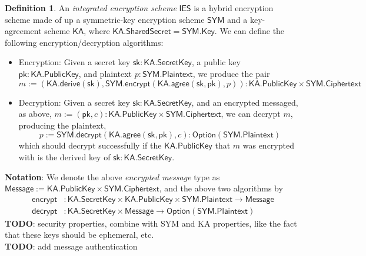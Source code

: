 \documentclass[a4paper]{article}
\newcommand{\TODO}[1]{{\color{red}\textbf{TODO}}: #1}
\theoremstyle{definition}
\newtheorem{definition}{Definition}[subsection]
\newcommand{\Ciphertext}{{\textsf{Ciphertext}}}
\newcommand{\IES}{{\textsf{IES}}}
\newcommand{\KA}{{\textsf{KA}}}
\newcommand{\Key}{{\textsf{Key}}}
\newcommand{\Message}{{\textsf{Message}}}
\newcommand{\Option}{{\textsf{Option}}}
\newcommand{\Plaintext}{{\textsf{Plaintext}}}
\newcommand{\PublicKey}{{\textsf{PublicKey}}}
\newcommand{\SYM}{{\textsf{SYM}}}
\newcommand{\SecretKey}{{\textsf{SecretKey}}}
\newcommand{\SharedSecret}{{\textsf{SharedSecret}}}
\newcommand{\agree}{{\textsf{agree}}}
\newcommand{\decrypt}{{\textsf{decrypt}}}
\newcommand{\derive}{{\textsf{derive}}}
\newcommand{\encrypt}{{\textsf{encrypt}}}
\newcommand{\pk}{{\textsf{pk}}}
\newcommand{\sk}{{\textsf{sk}}}
\begin{document}
\begin{definition}
    An \emph{integrated encryption scheme} $\IES$ is a hybrid encryption scheme made of up a symmetric-key encryption scheme $\SYM$ and a key-agreement scheme $\KA$, where $\KA.\SharedSecret = \SYM.\Key$. We can define the following encryption/decryption algorithms:
    \begin{itemize}
        \item Encryption: Given a secret key $\sk: \KA.\SecretKey$, a public key $\pk: \KA.\PublicKey$, and plaintext $p : \SYM.\Plaintext$, we produce the pair
            \[m := (\KA.\derive(\sk), \SYM.\encrypt(\KA.\agree(\sk, \pk), p)) : \KA.\PublicKey \times \SYM.\Ciphertext\]
        \item Decryption: Given a secret key $\sk : \KA.\SecretKey$, and an encrypted messaged, as above, $m := (\pk, c) : \KA.\PublicKey \times \SYM.\Ciphertext$, we can decrypt $m$, producing the plaintext,
            \[p := \SYM.\decrypt(\KA.\agree(\sk, \pk), c) : \Option(\SYM.\Plaintext)\]
            which should decrypt successfully if the $\KA.\PublicKey$ that $m$ was encrypted with is the derived key of $\sk : \KA.\SecretKey$.
    \end{itemize}

    \textbf{Notation}: We denote the above \emph{encrypted message} type as $\Message := \KA.\PublicKey \times \SYM.\Ciphertext$, and the above two algorithms by
    \begin{align*}
        \encrypt &: \KA.\SecretKey \times \KA.\PublicKey \times \SYM.\Plaintext \to \Message \\
        \decrypt &: \KA.\SecretKey \times \Message \to \Option(\SYM.\Plaintext)
    \end{align*}
    \TODO{security properties, combine with \SYM{} and \KA{} properties, like the fact that these keys should be ephemeral, etc.} \\
    \TODO{add message authentication}
\end{definition}
\end{document}

